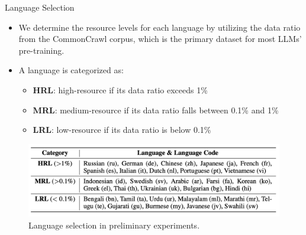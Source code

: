 \begin{frame}{Language Selection}
    \begin{itemize}
        \item We determine the resource levels for each language by utilizing the data ratio from the CommonCrawl corpus, which is the primary dataset for most LLMs’ pre-training. 
        \item A language is categorized as:
        \begin{itemize}
            \item \textbf{HRL}: high-resource if its data ratio exceeds 1\%
            \item \textbf{MRL}: medium-resource if its data ratio falls between 0.1\% and 1\%
            \item \textbf{LRL}: low-resource if its data ratio is below 0.1\%
        \end{itemize}
    \end{itemize}
    \begin{figure}
            \centering
            \includegraphics[width=\linewidth]{pic/language selection.png}
            \caption{Language selection in preliminary experiments.}
            \label{fig:language_selection}
    \end{figure}
\end{frame}

